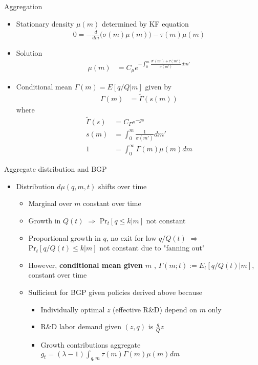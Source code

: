 \documentclass[english,usenames,dvipsnames]{beamer}
\begin{document}
\begin{frame}{Aggregation}\label{aggregation}
\hyperlink{closing_the_model}{}
\small
\begin{itemize}
\item Stationary density $\mu(m)$ determined by KF equation
\begin{align*}
0 = - \frac{d}{dm} \Big( \sigma(m) \mu(m) \Big) - \tau(m) \mu(m)
\end{align*}
\item Solution
\begin{align*}
\mu(m) &= C_\mu e^{-\int_0^m \frac{\sigma'(m') + \tau(m')}{\sigma(m')}dm'} 
\end{align*}
\item Conditional mean $\Gamma(m) = E[q/Q | m]$ given by 
\begin{align*}
\Gamma(m) &= \tilde{\Gamma}(s(m))
\end{align*}
where
\begin{align*}
\tilde{\Gamma}(s) &= C_{\Gamma} e^{-gs} \\
s(m) &= \int_0^m \frac{1}{\sigma(m')} dm' \\
1 &= \int_0^{\infty} \Gamma(m) \mu(m) dm
\end{align*}
\end{itemize}
\end{frame}




\begin{frame}{Aggregate distribution and BGP}\label{aggregate_distribution_and_bgp}
\hyperlink{closing_the_model}{}
\begin{itemize}
\item Distribution $d\mu(q,m,t)$ shifts over time
\begin{itemize}
\item Marginal over $m$ constant over time
\item Growth in $Q(t)$ $\Rightarrow$ $\textrm{Pr}_t[q \le k | m]$ not constant
\item Proportional growth in $q$, no exit for low $q/Q(t)$ $\Rightarrow$ $\textrm{Pr}_t[q /Q(t)\le k | m]$ not constant due to "fanning out"
\item However, \textbf{\alert{conditional mean given $m$}} , $\Gamma(m;t) := E_t[q/Q(t) | m]$, constant over time
\item Sufficient for BGP given policies derived above because
\begin{itemize}
\item Individually optimal $z$ (effective R\&D) depend on $m$ only
\item R\&D labor demand given $(z,q)$ is $\frac{q}{Q}z$
\item Growth contributions aggregate $g_t = (\lambda -1)\int_{q,m} \tau(m) \Gamma(m) \mu(m) dm$
\end{itemize}
\end{itemize}
\end{itemize}
\end{frame}
\end{document}
